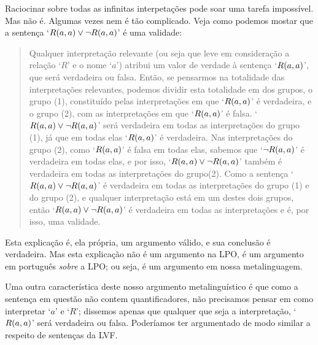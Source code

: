 Raciocinar sobre todas as infinitas interpetações pode soar uma tarefa impossível.
Mas não é.
Algumas vezes nem  é tão complicado.
Veja como podemos mostar que a sentença \mbox{`$\mathord{R}(a,a)\vee\neg \mathord{R}(a,a)$'} é uma validade:
	\begin{quote}
		\label{allmodels1}
		Qualquer interpretação relevante (ou seja que leve em consideração a relação `$R$' e o nome `$a$') atribui um valor de verdade à sentença `$\mathord{R}(a,a)$', que será verdadeira ou falsa.
		Então, se pensarmos na totalidade das interpretações relevantes, podemos dividir esta totalidade em dos grupos, o grupo (1), constituído pelas interpretações em que `$\mathord{R}(a,a)$' é verdadeira, e o grupo (2), com as interpretações em que  `$\mathord{R}(a,a)$' é falsa.
		`$\mathord{R}(a,a)\vee\neg \mathord{R}(a,a)$' será verdadeira em todas as interpretações do grupo (1), já que em todas elas `$\mathord{R}(a,a)$' é verdadeira.
		Nas interpretações do grupo (2), como  `$\mathord{R}(a,a)$' é falsa em todas elas, sabemos que `$\neg \mathord{R}(a,a)$' é verdadeira em todas elas, e por isso, `$\mathord{R}(a,a)\vee\neg \mathord{R}(a,a)$' também é verdadeira em todas as interpretações do grupo(2).
		Como a sentença `$\mathord{R}(a,a)\vee\neg \mathord{R}(a,a)$' é verdadeira em todas as interpretações do grupo (1) e do grupo (2), e qualquer interpretação está em um destes dois grupos, então `$\mathord{R}(a,a)\vee\neg \mathord{R}(a,a)$' é verdadeira em todas as interpretações e é, por isso, uma validade.
	\end{quote}
Esta explicação é, ela própria, um argumento válido, e sua conclusão é verdadeira. Mas esta explicação não é um argumento na LPO, é um argumento em português \emph{sobre} a LPO; ou seja, é um argumento em nossa metalinguagem.

Uma outra característica deste nosso argumento metalinguístico é que como a sentença em questão não contem quantificadores, não precisamos pensar em como interpretar `$a$' e `$R$'; dissemos apenas que qualquer que seja a interpretação,  `$\mathord{R}(a,a)$' será verdadeira ou falsa.
Poderíamos ter argumentado de modo similar a respeito de sentenças da LVF.

